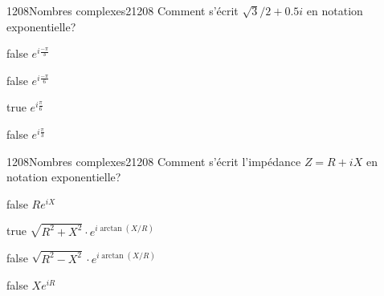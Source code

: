             \begin{question}{1208}{Nombres complexes}{2}{1208}
                Comment s'écrit $\sqrt{3}/2 + 0.5i$ en notation exponentielle?
            \end{question}
            \begin{reponses}
                \item[false] $e^{i\frac{-\pi}{3}}$
                \item[false]  $e^{i\frac{-\pi}{6}}$
                \item[true]  $e^{i\frac{\pi}{6}}$
                \item[false] $e^{i\frac{\pi}{3}}$
            \end{reponses}
            \begin{question}{1208}{Nombres complexes}{2}{1208}
                Comment s'écrit l'impédance $Z=R+iX$ en notation exponentielle?
            \end{question}
            \begin{reponses}
                \item[false] $Re^{iX}$
                \item[true]  $\sqrt{R^2+X^2}\cdot e^{i\arctan(X/R)}$
                \item[false]  $\sqrt{R^2-X^2}\cdot e^{i\arctan(X/R)}$
                \item[false] $Xe^{iR}$
            \end{reponses}
